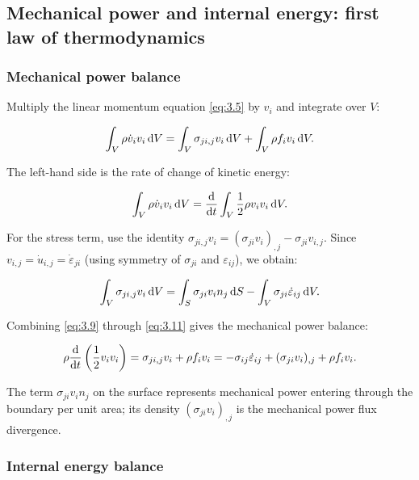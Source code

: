 \subsection{Mechanical power and internal energy: first law of thermodynamics}
\label{sec:3.3}

\subsubsection{Mechanical power balance}

Multiply the linear momentum equation \eqref{eq:3.5} by $v_i$ and integrate over $V$:

\begin{equation}
\int_V \rho \dot{v}_i v_i \, \mathrm{d} V
=
\int_V \sigma_{ji,j} v_i \, \mathrm{d} V
+
\int_V \rho f_i v_i \, \mathrm{d} V.
\label{eq:3.9}
\end{equation}

The left-hand side is the rate of change of kinetic energy:

\begin{equation}
\int_V \rho \dot{v}_i v_i \, \mathrm{d} V
=
\frac{\mathrm{d}}{\mathrm{d} t} \int_V \frac{1}{2}\rho v_i v_i \, \mathrm{d} V.
\label{eq:3.10}
\end{equation}

For the stress term, use the identity $\sigma_{ji,j}v_i = (\sigma_{ji}v_i)_{,j} - \sigma_{ji}v_{i,j}$. Since $v_{i,j} = \dot{u}_{i,j} = \dot{\varepsilon}_{ji}$ (using symmetry of $\sigma_{ji}$ and $\varepsilon_{ij}$), we obtain:

\begin{equation}
\int_V \sigma_{ji,j} v_i \, \mathrm{d} V
=
\int_S \sigma_{ji} v_i n_j \, \mathrm{d} S
-
\int_V \sigma_{ji} \dot{\varepsilon}_{ij} \, \mathrm{d} V.
\label{eq:3.11}
\end{equation}

Combining \eqref{eq:3.9} through \eqref{eq:3.11} gives the mechanical power balance:

\begin{equation}
\rho \frac{\mathrm{d}}{\mathrm{d} t}\left(\frac{1}{2}v_i v_i\right)
=
\sigma_{ji,j}v_i + \rho f_i v_i
=
-\sigma_{ij}\dot{\varepsilon}_{ij} + (\sigma_{ji}v_i)_{,j} + \rho f_i v_i.
\label{eq:3.12}
\end{equation}

The term $\sigma_{ji}v_i n_j$ on the surface represents mechanical power entering through the boundary per unit area; its density $(\sigma_{ji}v_i)_{,j}$ is the mechanical power flux divergence.

\subsubsection{Internal energy balance}

